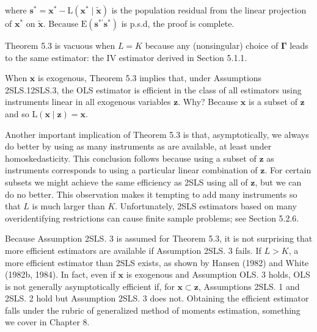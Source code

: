 \documentclass[10pt]{article}
\begin{document}
where $\mathbf{s}^{*}=\mathbf{x}^{*}-\mathrm{L}\left(\mathbf{x}^{*} \mid \tilde{\mathbf{x}}\right)$ is the population residual from the linear projection of $\mathbf{x}^{*}$ on $\tilde{\mathbf{x}}$. Because $\mathrm{E}\left(\mathbf{s}^{* \prime} \mathbf{s}^{*}\right)$ is p.s.d, the proof is complete.

Theorem 5.3 is vacuous when $L=K$ because any (nonsingular) choice of $\boldsymbol{\Gamma}$ leads to the same estimator: the IV estimator derived in Section 5.1.1.

When $\mathbf{x}$ is exogenous, Theorem 5.3 implies that, under Assumptions 2SLS.12SLS.3, the OLS estimator is efficient in the class of all estimators using instruments linear in all exogenous variables $\mathbf{z}$. Why? Because $\mathbf{x}$ is a subset of $\mathbf{z}$ and so $\mathrm{L}(\mathbf{x} \mid \mathbf{z})=\mathbf{x}$.

Another important implication of Theorem 5.3 is that, asymptotically, we always do better by using as many instruments as are available, at least under homoskedasticity. This conclusion follows because using a subset of $\mathbf{z}$ as instruments corresponds to using a particular linear combination of $\mathbf{z}$. For certain subsets we might achieve the same efficiency as 2SLS using all of $\mathbf{z}$, but we can do no better. This observation makes it tempting to add many instruments so that $L$ is much larger than $K$. Unfortunately, 2SLS estimators based on many overidentifying restrictions can cause finite sample problems; see Section 5.2.6.

Because Assumption 2SLS. 3 is assumed for Theorem 5.3, it is not surprising that more efficient estimators are available if Assumption 2SLS. 3 fails. If $L>K$, a more efficient estimator than 2SLS exists, as shown by Hansen (1982) and White (1982b, 1984). In fact, even if $\mathbf{x}$ is exogenous and Assumption OLS. 3 holds, OLS is not generally asymptotically efficient if, for $\mathbf{x} \subset \mathbf{z}$, Assumptions 2SLS. 1 and 2SLS. 2 hold but Assumption 2SLS. 3 does not. Obtaining the efficient estimator falls under the rubric of generalized method of moments estimation, something we cover in Chapter 8.
\end{document}
